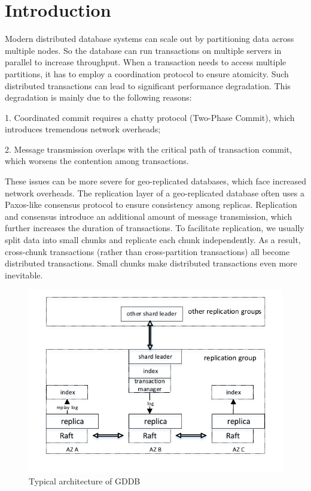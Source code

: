 \documentclass[conference]{IEEEtran}
\begin{document}
\section{Introduction}

Modern distributed database systems can scale out by partitioning data across multiple nodes.
So the database can run transactions on multiple servers in parallel to increase throughput.
When a transaction needs to access multiple partitions, it has to employ a coordination protocol to ensure atomicity.
Such distributed transactions can lead to significant performance degradation.
This degradation is mainly due to the following reasons\cite{Calvin:conf/sigmod/ThomsonDWRSA12}:

1. Coordinated commit requires a chatty protocol (Two-Phase Commit), which introduces tremendous network overheads;

2. Message transmission overlaps with the critical path of transaction commit, which worsens the contention among transactions.

These issues can be more severe for geo-replicated databases, which face increased network overheads.
The replication layer of a geo-replicated database often uses a Paxos-like consensus protocol to ensure consistency among replicas.
Replication and consensus introduce an additional amount of message transmission, which further increases the duration of transactions.
To facilitate replication, we usually split data into small chunks and replicate each chunk independently.
As a result, cross-chunk transactions (rather than cross-partition transactions) all become distributed transactions.
Small chunks make distributed transactions even more inevitable.

\begin{figure}[tbp]
  \centerline{\includegraphics[scale=0.8]{figure/architecture.pdf}}
  \caption{Typical architecture of GDDB}
  \label{fig:architecture}
\end{figure}
\end{document}
